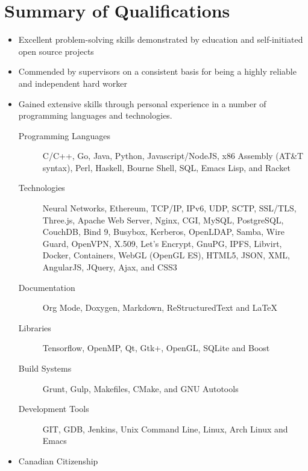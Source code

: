 \documentclass[11pt,letterpaper]{moderncv}
\newenvironment{coverletter}[2][Recruitment team]{%
  \recipient{#1}{#2}%
  \opening{Dear Sir or Madam,}%
  \closing{Sincerely,}%
  \enclosure{R\'esum\'e}%
  \makelettertitle%
}{%
  \makeletterclosing%
  \clearpage%
}
\newif\ifcoop%
\newif\ifincludeletter%
\begin{document}
\ifincludeletter%
\begin{coverletter}{Company, Inc.\\123 somestreet\\some city}
  \lipsum[1-3]%
\end{coverletter}
\fi

\makecvtitle%

\ifcoop%
3B Computer Science, Honours, Co-operative Program, University of
Waterloo, ID Number: 20580433
\fi

\section{Summary of Qualifications}

\begin{itemize}
\item Excellent problem-solving skills demonstrated by education
  and self-initiated open source projects
\item Commended by supervisors on a consistent basis for being a
  highly reliable and independent hard worker
\item Gained extensive skills through personal experience in a number
  of programming languages and technologies.
  \begin{description}
  \item[Programming Languages] C/C++, Go, Java, Python,
    Javascript/NodeJS, x86 Assembly (AT\&T syntax), Perl, Haskell,
    Bourne Shell, SQL, Emacs Lisp, and Racket
  \item[Technologies] Neural Networks, Ethereum, TCP/IP, IPv6, UDP,
    SCTP, SSL/TLS, Three.js, Apache Web Server, Nginx, CGI, MySQL,
    PostgreSQL, CouchDB, Bind 9, Busybox, Kerberos, OpenLDAP, Samba,
    Wire Guard, OpenVPN, X.509, Let's Encrypt, GnuPG, IPFS, Libvirt,
    Docker, Containers, WebGL (OpenGL ES), HTML5, JSON, XML,
    AngularJS, JQuery, Ajax, and CSS3
  \item[Documentation] Org Mode, Doxygen, Markdown, ReStructuredText
    and \LaTeX{}
  \item[Libraries] Tensorflow, OpenMP, Qt, Gtk+, OpenGL, SQLite and Boost
  \item[Build Systems] Grunt, Gulp, Makefiles, CMake, and GNU Autotools
  \item[Development Tools] GIT, GDB, Jenkins, Unix Command Line,
    Linux, Arch Linux and Emacs
  \end{description}
\item Canadian Citizenship
\end{itemize}
\end{document}
